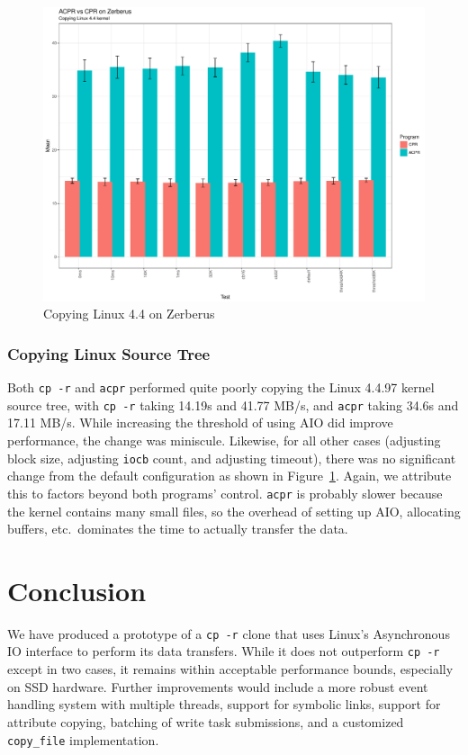 \documentclass[11pt]{article}
\begin{document}
\begin{figure}[ht!]
        \includegraphics[width=\textwidth,]{CSRES_Linux_Barplot.pdf}
        \caption{Copying Linux 4.4 on Zerberus}
        \label{fig:csres_linux}
\end{figure}

\subsubsection{Copying Linux Source Tree} \label{ssubsec:csres_large}

Both \texttt{cp -r} and \texttt{acpr} performed quite poorly copying the Linux
4.4.97 kernel source tree, with \texttt{cp -r} taking 14.19s and 41.77 MB/s, and
\texttt{acpr} taking 34.6s and 17.11 MB/s. While increasing the threshold of
using AIO did improve performance, the change was miniscule. Likewise, for all
other cases (adjusting block size, adjusting \texttt{iocb} count, and adjusting
timeout), there was no significant change from the default configuration as
shown in Figure~\ref{fig:csres_linux}. Again, we attribute this to factors
beyond both programs' control. \texttt{acpr} is probably slower because the
kernel contains many small files, so the overhead of setting up AIO, allocating
buffers, etc.\ dominates the time to actually transfer the data.

\section{Conclusion} \label{sec:conc}

We have produced a prototype of a \texttt{cp -r} clone that uses Linux's
Asynchronous IO interface to perform its data transfers. While it does not
outperform \texttt{cp -r} except in two cases, it remains within acceptable
performance bounds, especially on SSD hardware. Further improvements would
include a more robust event handling system with multiple threads, support for
symbolic links, support for attribute copying, batching of write task
submissions, and a customized \texttt{copy\_file} implementation.
\end{document}
